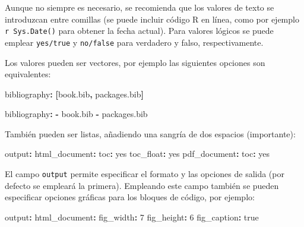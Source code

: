 \documentclass[
]{book}
\newenvironment{Shaded}{\begin{snugshade}}{\end{snugshade}}
\newcommand{\AttributeTok}[1]{\textcolor[rgb]{0.77,0.63,0.00}{#1}}
\newcommand{\CharTok}[1]{\textcolor[rgb]{0.31,0.60,0.02}{#1}}
\newcommand{\DecValTok}[1]{\textcolor[rgb]{0.00,0.00,0.81}{#1}}
\newcommand{\FunctionTok}[1]{\textcolor[rgb]{0.00,0.00,0.00}{#1}}
\newcommand{\KeywordTok}[1]{\textcolor[rgb]{0.13,0.29,0.53}{\textbf{#1}}}
\theoremstyle{break}
\theoremstyle{nonumberplain}
\begin{document}
Aunque no siempre es necesario, se recomienda que los valores de texto se introduzcan entre comillas (se puede incluir código R en línea, como por ejemplo \texttt{\textasciigrave{}r\ Sys.Date()\textasciigrave{}} para obtener la fecha actual). Para valores lógicos se puede emplear \texttt{yes/true} y \texttt{no/false} para verdadero y falso, respectivamente.

Los valores pueden ser vectores, por ejemplo las siguientes opciones son equivalentes:

\begin{Shaded}
\begin{Highlighting}[]
\FunctionTok{bibliography}\KeywordTok{:}\AttributeTok{ }\KeywordTok{[}\AttributeTok{book.bib}\KeywordTok{,}\AttributeTok{ packages.bib}\KeywordTok{]}
\end{Highlighting}
\end{Shaded}

\begin{Shaded}
\begin{Highlighting}[]
\FunctionTok{bibliography}\KeywordTok{:}
\KeywordTok{{-}}\AttributeTok{ book.bib}
\KeywordTok{{-}}\AttributeTok{ packages.bib}
\end{Highlighting}
\end{Shaded}

También pueden ser listas, añadiendo una sangría de dos espacios (importante):

\begin{Shaded}
\begin{Highlighting}[]
\FunctionTok{output}\KeywordTok{:}
\AttributeTok{  }\FunctionTok{html\_document}\KeywordTok{:}
\AttributeTok{    }\FunctionTok{toc}\KeywordTok{:}\AttributeTok{ }\CharTok{yes}
\AttributeTok{    }\FunctionTok{toc\_float}\KeywordTok{:}\AttributeTok{ }\CharTok{yes}
\AttributeTok{  }\FunctionTok{pdf\_document}\KeywordTok{:}
\AttributeTok{    }\FunctionTok{toc}\KeywordTok{:}\AttributeTok{ }\CharTok{yes}
\end{Highlighting}
\end{Shaded}

El campo \texttt{output} permite especificar el formato y las opciones de salida (por defecto se empleará la primera). Empleando este campo también se pueden especificar opciones gráficas para los bloques de código, por ejemplo:

\begin{Shaded}
\begin{Highlighting}[]
\FunctionTok{output}\KeywordTok{:}
\AttributeTok{  }\FunctionTok{html\_document}\KeywordTok{:}
\AttributeTok{    }\FunctionTok{fig\_width}\KeywordTok{:}\AttributeTok{ }\DecValTok{7}
\AttributeTok{    }\FunctionTok{fig\_height}\KeywordTok{:}\AttributeTok{ }\DecValTok{6}
\AttributeTok{    }\FunctionTok{fig\_caption}\KeywordTok{:}\AttributeTok{ }\CharTok{true}
\end{Highlighting}
\end{Shaded}
\end{document}
